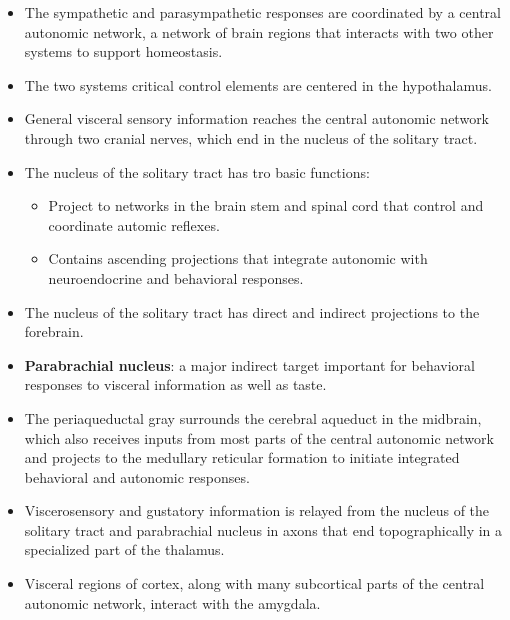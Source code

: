 \documentclass[12pt,a4paper]{article}
\begin{document}
\begin{itemize}
    \item The sympathetic and parasympathetic responses are coordinated by a central autonomic network, a network of brain regions that interacts with two other systems to support homeostasis.
    \item The two systems critical control elements are centered in the hypothalamus.
    \item General visceral sensory information reaches the central autonomic network through two cranial nerves, which end in the nucleus of the solitary tract. 
    \item The nucleus of the solitary tract has tro basic functions:
        \begin{itemize}
            \item Project to networks in the brain stem and spinal cord that control and coordinate automic reflexes.
            \item Contains ascending projections that integrate autonomic with neuroendocrine and behavioral responses.
        \end{itemize}
    \item The nucleus of the solitary tract has direct and indirect projections to the forebrain.
    \item \textbf{Parabrachial nucleus}: a major indirect target important for behavioral responses to visceral information as well as taste.
    \item The periaqueductal gray surrounds the cerebral aqueduct in the midbrain, which also receives inputs from most parts of the central autonomic network and projects to the medullary reticular formation to initiate integrated behavioral and autonomic responses.
    \item  Viscerosensory and gustatory information is relayed from the nucleus of the solitary tract and parabrachial nucleus in axons that end topographically in a specialized part of the thalamus.
    \item Visceral regions of cortex, along with many subcortical parts of the central autonomic network, interact with the amygdala.
\end{itemize}
\end{document}
